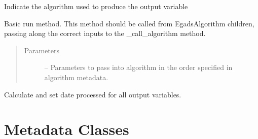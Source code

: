 \documentclass[a4paper,10pt,openany,english]{sphinxmanual}
\begin{document}
\begin{fulllineitems}
\begin{fulllineitems}
\label{egadsapi:egads.core.egads_core.EgadsAlgorithm.processor}
Indicate the algorithm used to produce the output variable

\end{fulllineitems}


\begin{fulllineitems}
\label{egadsapi:egads.core.egads_core.EgadsAlgorithm.run}
Basic run method. This method should be called from EgadsAlgorithm children,
passing along the correct inputs to the \_call\_algorithm method.
\begin{quote}\begin{description}
\item[{Parameters}] \leavevmode
{} -- 
Parameters to pass into algorithm in the order specified in algorithm metadata.


\end{description}\end{quote}

\end{fulllineitems}


\begin{fulllineitems}
\label{egadsapi:egads.core.egads_core.EgadsAlgorithm.time_stamp}
Calculate and set date processed for all output variables.

\end{fulllineitems}


\end{fulllineitems}



\section{Metadata Classes}
\label{egadsapi:metadata-classes}\label{egadsapi:module-egads.core.metadata}
\end{document}
